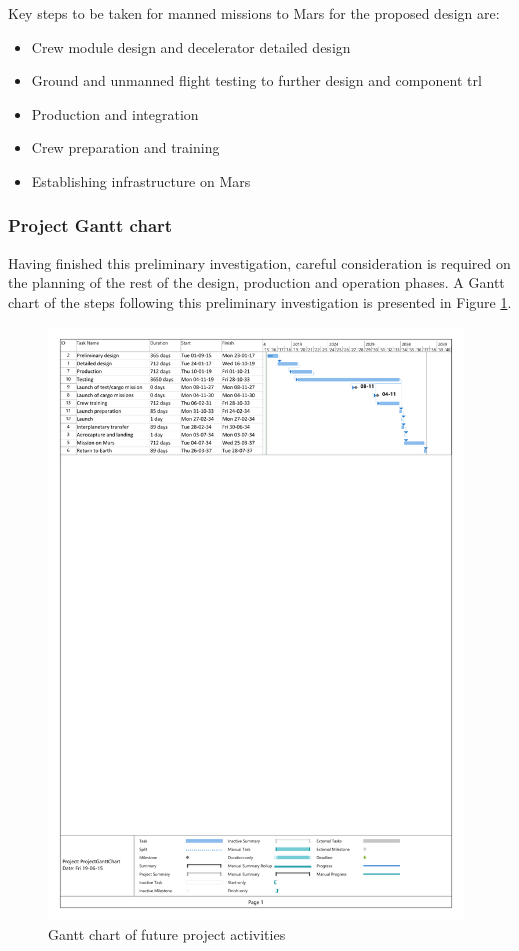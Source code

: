 Key steps to be taken for manned missions to Mars for the proposed design are:
\begin{itemize}
\item Crew module design and decelerator detailed design
\item Ground and unmanned flight testing to further design and component \gls{trl}
\item Production and integration
\item Crew preparation and training
\item Establishing infrastructure on Mars
\end{itemize}

\subsubsection{Project Gantt chart}
Having finished this preliminary investigation, careful consideration is required on the planning of the rest of the design, production and operation phases. A Gantt chart of the steps following this preliminary investigation is presented in Figure \ref{fig:projectganttchart}.\\

\begin{figure}[h]
	\centering
	\includegraphics[width=0.98\textwidth]{./Figure/Schedule/ProjectGanttChart_v1_cropped.pdf}
	\caption{Gantt chart of future project activities}
	\label{fig:projectganttchart}
\end{figure}


